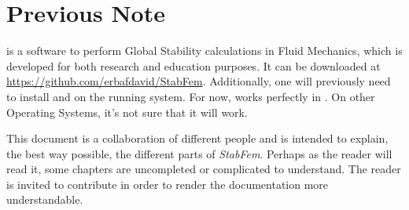 
\section*{Previous Note}

 is a software to perform Global Stability calculations in Fluid Mechanics, which is developed for both research and education purposes. It can be downloaded at \url{https://github.com/erbafdavid/StabFem}. Additionally, one will previously need to install  and  on the running system. For now,  works perfectly in . On other Operating Systems, it's not sure that it will work.


This document is a collaboration of different people and is intended to explain, the best way possible, the different parts of \textit{StabFem}. Perhaps as the reader will read it, some chapters are uncompleted or complicated to understand. The reader is invited to contribute in order to render the documentation more understandable.


